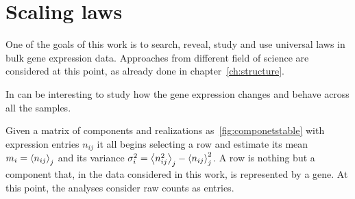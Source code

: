 \chapter{Scaling laws}\label{ch:scalinglaws}
One of the goals of this work is to search, reveal, study and use universal laws in bulk gene expression data. Approaches from different field of science are considered at this point, as already done in chapter~\ref{ch:structure}.~\nocite{altmann2016statistical}

In can be interesting to study how the gene expression changes and behave across all the samples.

Given a matrix of components and realizations as~\ref{fig:componetstable} with expression entries $n_{i j}$ it all begins selecting a row and estimate its mean $m_i=\left\langle n_{i
 j}\right\rangle_j$ and its variance $\sigma^2_{i}=\left\langle n_{i j}^2\right\rangle_j - \left\langle n_{i j}\right\rangle^2_j$. A row is nothing but a component that, in the data considered in this work, is represented by a gene. At this point, the analyses consider raw counts as entries.  


\FloatBarrier

\FloatBarrier
